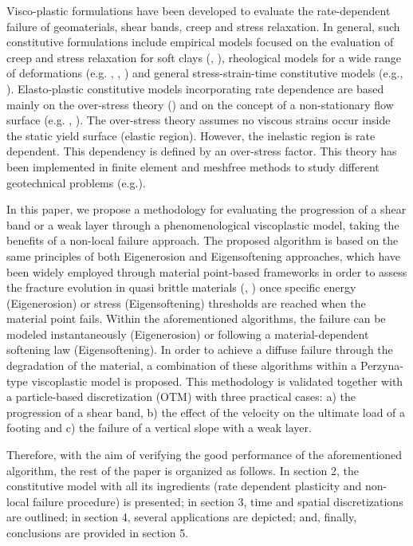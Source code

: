 \documentclass[applsci,journal,article,submit,moreauthors,pdftex]{Definitions/mdpi}
\begin{document}
Visco-plastic formulations have been developed to evaluate the rate-dependent failure of geomaterials, shear bands, creep and stress relaxation. In general, such constitutive formulations include empirical models focused on the evaluation of creep and stress relaxation for soft clays (\cite{Bjerrum1967}, \cite{Kim2001}), rheological models for a wide range of deformations (e.g. \cite{Feda}, \cite{Dutto2017}, \cite{Manzanal2015}) and general stress-strain-time constitutive models (e.g.\cite{ADACHI1974}, \cite{HEERES20021}). Elasto-plastic constitutive models incorporating rate dependence are based mainly on the over-stress theory (\cite{Perzyna:66}) and on the concept of a non-stationary flow surface (e.g. \cite{Naghdi1963}, \cite{Nova1982}). The over-stress theory assumes no viscous strains occur inside the static yield surface (elastic region). However, the inelastic region is rate dependent. This dependency is defined by an over-stress factor. This theory has been implemented in finite element and meshfree methods to study different geotechnical problems (e.g.\cite{Manzanal2015,BlancPastor2012}).  

In this paper, we propose a methodology for evaluating the progression of a shear band or a weak layer through a phenomenological viscoplastic model, taking the benefits of a non-local failure approach. The proposed algorithm is based on the same principles of both Eigenerosion and Eigensoftening approaches, which have been widely employed through material point-based frameworks in order to assess the fracture evolution in quasi brittle materials (\cite{Navas2018a}, \cite{Molinos2020b}) once specific energy (Eigenerosion) or stress (Eigensoftening) thresholds are reached when the material point fails. Within the aforementioned algorithms, the failure can be modeled instantaneously (Eigenerosion) or following a material-dependent softening law (Eigensoftening). In order to achieve a diffuse failure through the degradation of the material, a combination of these algorithms within a Perzyna-type viscoplastic model is proposed. This methodology is validated together with a particle-based discretization (OTM) with three practical cases: a) the progression of a shear band, b) the effect of the velocity on the ultimate load of a footing and c) the failure of a vertical slope with a weak layer. 

Therefore, with the aim of verifying the good performance of the aforementioned algorithm, the rest of the paper is organized as follows. In section 2, the constitutive model with all its ingredients (rate dependent plasticity and non-local failure procedure) is presented; in section 3, time and spatial discretizations are outlined; in section 4, several applications are depicted; and, finally, conclusions are provided in section 5.
\end{document}
